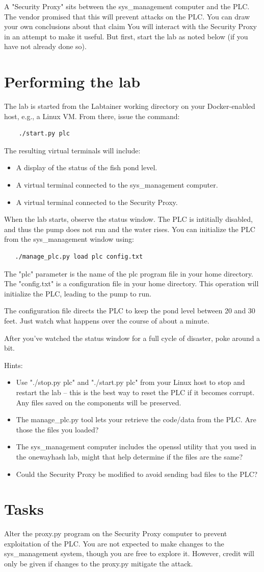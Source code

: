 \documentclass{article}
\begin{document}
A "Security Proxy" sits between the sys\_management computer and the PLC.  The vendor promised
that this will prevent attacks on the PLC.  You can draw your own conclusions about that claim
You will interact with the Security Proxy in an attempt to make it useful.  But first, start the lab
as noted below (if you have not already done so).

\section {Performing the lab}
The lab is started from the Labtainer working
directory on your Docker-enabled host, e.g., a Linux VM.
From there, issue the command:
\begin{verbatim}
    ./start.py plc
\end{verbatim}

The resulting virtual terminals will include: 
\begin{itemize}
\item A display of the status of the fish pond level.
\item A virtual terminal connected to the sys\_management computer.
\item A virtual terminal connected to the Security Proxy.
\end{itemize}
When the lab starts, observe the status window.  The PLC is intitially
disabled, and thus the pump does not run and the water rises.  You
can initialize the PLC from the sys\_management window using:
\begin{verbatim}
   ./manage_plc.py load plc config.txt
\end{verbatim}

The "plc" parameter is the name of the plc program file in your home directory.
The "config.txt" is a configuration file in your home directory.  This operation
will initialize the PLC, leading to the pump to run.

The configuration file directs the PLC to keep the pond level between 20 and 30 feet.
Just watch what happens over the course of about a minute.

After you've watched the status window for a full cycle of disaster, 
poke around a bit.  

Hints:
\begin{itemize}
\item Use "./stop.py plc" and "./start.py plc" from your Linux host to stop and restart the lab -- this is the
best way to reset the PLC if it becomes corrupt.  Any files saved on the components will be preserved.
\item The manage\_plc.py tool lets your retrieve the code/data from the PLC.  Are those the files you loaded?
\item The sys\_management computer includes the openssl utility that you used in the onewayhash lab, might that
help determine if the files are the same?
\item Could the Security Proxy be modified to avoid sending bad files to the PLC?
\end{itemize}

\section {Tasks}
Alter the proxy.py program on the Security Proxy computer to prevent exploitation of the PLC.
You are not expected to make changes to the sys\_management system, though you are free to explore it.
However, credit will only be given if changes to the proxy.py mitigate the attack.
\end{document}
